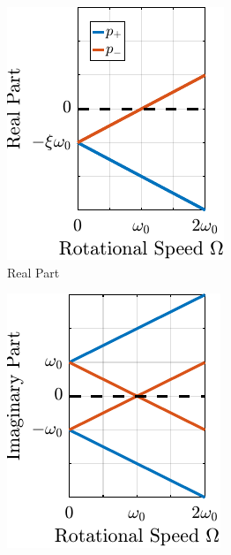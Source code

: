 \documentclass[10pt]{iopart}
\begin{document}
\begin{figure}[htbp]
\begin{subfigure}[c]{0.48\linewidth}
\includegraphics[width=\linewidth]{figs/fig02a.pdf}
\caption{\label{fig:campbell_diagram_real} Real Part}
\end{subfigure}
\hfill
\begin{subfigure}[c]{0.48\linewidth}
\includegraphics[width=\linewidth]{figs/fig02b.pdf}

\end{subfigure}
\end{figure}
\end{document}
